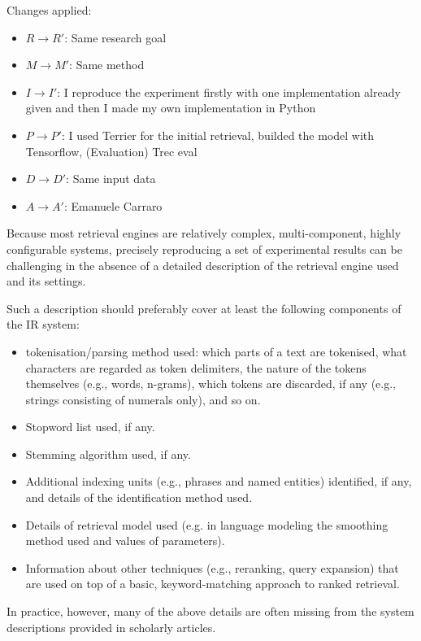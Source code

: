 Changes applied:

\begin{itemize}
\item $R \rightarrow R'$: Same research goal
\item $M \rightarrow M'$: Same method
\item $I \rightarrow I'$: I reproduce the experiment firstly with one implementation already given and then I made my own implementation in Python
\item $P \rightarrow P'$: I used Terrier for the initial retrieval, builded the model with Tensorflow, (Evaluation) Trec eval
\item $D \rightarrow D'$: Same input data
\item $A \rightarrow A'$: Emanuele Carraro
\end{itemize}

Because most retrieval engines are relatively complex, multi-component, highly configurable systems, precisely reproducing a set of experimental results can be challenging in the absence of a detailed description of the retrieval engine used and its settings.

Such a description should preferably cover at least the following components of the IR system:

\begin{itemize}
 \item tokenisation/parsing method used: which parts of a text are tokenised, what characters are regarded as token delimiters, the nature of the tokens themselves (e.g., words, n-grams), which tokens are discarded, if any (e.g., strings consisting of numerals only), and so on.
 \item Stopword list used, if any.
 \item Stemming algorithm used, if any.
 \item Additional indexing units (e.g., phrases and named entities) identified, if any, and details of the identification method used.
 \item Details of retrieval model used (e.g. in language modeling the smoothing method used and values of parameters).
 \item Information about other techniques (e.g., reranking, query expansion) that are used on top of a basic, keyword-matching approach to ranked retrieval.
\end{itemize}

In practice, however, many of the above details are often missing from the system descriptions provided in scholarly articles.

